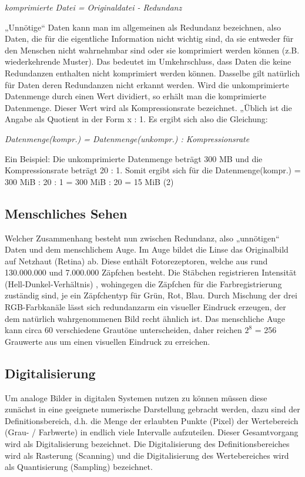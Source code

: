 \begin{center}
\textit{komprimierte Datei = Originaldatei - Redundanz}
\end{center}

„Unnötige“ Daten kann man im allgemeinen als Redundanz bezeichnen, also Daten, die für die eigentliche Information nicht wichtig sind, da sie entweder für den Menschen nicht wahrnehmbar sind oder sie komprimiert werden können (z.B. wiederkehrende Muster). Das bedeutet im Umkehrschluss, dass Daten die keine Redundanzen enthalten nicht komprimiert werden können. Dasselbe gilt natürlich für Daten deren Redundanzen nicht erkannt werden. Wird die unkomprimierte Datenmenge durch einen Wert dividiert, so erhält man die komprimierte Datenmenge. Dieser Wert wird als Kompressionsrate bezeichnet. „Üblich ist die Angabe als Quotient in der Form x : 1. Es ergibt sich also die Gleichung:

\begin{center}
\textit{Datenmenge(kompr.) = Datenmenge(unkompr.) : Kompressionsrate}
\end{center}

Ein Beispiel: 
Die unkomprimierte Datenmenge beträgt 300 MB und die Kompressionsrate beträgt 20 : 1.
Somit ergibt sich für die Datenmenge(kompr.) = 300 MiB : 20 : 1 = 300 MiB : 20 = 15 MiB (2)

\subsection{\textbf{Menschliches Sehen}}
Welcher Zusammenhang besteht nun zwischen Redundanz, also „unnötigen“ Daten und dem menschlichem Auge. Im Auge bildet die Linse das Originalbild auf Netzhaut (Retina) ab. Diese enthält Fotorezeptoren, welche aus rund 130.000.000 und 7.000.000 Zäpfchen besteht. Die Stäbchen registrieren Intensität (Hell-Dunkel-Verhältnis) , wohingegen die Zäpfchen für die Farbregistrierung zuständig sind, je ein Zäpfchentyp für Grün, Rot, Blau. Durch Mischung der drei RGB-Farbkanäle lässt sich redundanzarm ein visueller Eindruck erzeugen, der dem natürlich wahrgenommenen Bild recht ähnlich ist. Das menschliche Auge kann circa 60 verschiedene Grautöne unterscheiden, daher reichen $2^{8}$ = 256 Grauwerte aus um einen visuellen Eindruck zu erreichen. 

\subsection{\textbf{Digitalisierung}}
Um analoge Bilder in digitalen Systemen nutzen zu können müssen diese zunächst in eine geeignete numerische Darstellung gebracht werden, dazu sind der Definitionsbereich, d.h. die Menge der erlaubten Punkte (Pixel) der Wertebereich (Grau- / Farbwerte) in endlich viele Intervalle aufzuteilen.
Dieser Gesamtvorgang wird als Digitalisierung bezeichnet. Die Digitalisierung des Definitionsbereiches wird als Rasterung (Scanning) und die Digitalisierung des Wertebereiches wird als Quantisierung (Sampling) bezeichnet.

